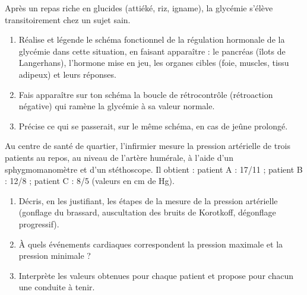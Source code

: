 \documentclass[11pt]{article}
\begin{document}
\begin{exercice}
Après un repas riche en glucides (attiéké, riz, igname), la glycémie s'élève transitoirement chez un sujet sain.
\begin{enumerate}
\item Réalise et légende le schéma fonctionnel de la régulation hormonale de la glycémie dans cette situation, en faisant apparaître : le pancréas (îlots de Langerhans), l'hormone mise en jeu, les organes cibles (foie, muscles, tissu adipeux) et leurs réponses.
\item Fais apparaître sur ton schéma la boucle de rétrocontrôle (rétroaction négative) qui ramène la glycémie à sa valeur normale.
\item Précise ce qui se passerait, sur le même schéma, en cas de jeûne prolongé.
\end{enumerate}
\end{exercice}

\begin{exercice}
Au centre de santé de quartier, l'infirmier mesure la pression artérielle de trois patients au repos, au niveau de l'artère humérale, à l'aide d'un sphygmomanomètre et d'un stéthoscope. Il obtient : patient A : 17/11 ; patient B : 12/8 ; patient C : 8/5 (valeurs en cm de Hg).
\begin{enumerate}
\item Décris, en les justifiant, les étapes de la mesure de la pression artérielle (gonflage du brassard, auscultation des bruits de Korotkoff, dégonflage progressif).
\item À quels événements cardiaques correspondent la pression maximale et la pression minimale ?
\item Interprète les valeurs obtenues pour chaque patient et propose pour chacun une conduite à tenir.
\end{enumerate}
\end{exercice}
\end{document}
